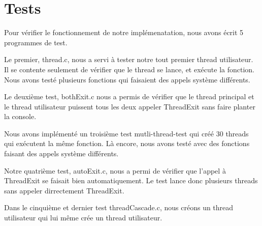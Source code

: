 \documentclass[12pt]{article}
\begin{document}
\section {Tests}

Pour vérifier le fonctionnement de notre implémenatation, nous avons écrit 5 programmes de test.

Le premier, thread.c, nous a servi à tester notre tout premier thread utilisateur. Il se contente seulement de vérifier que le thread se lance, et exécute la fonction. Nous avons testé plusieurs fonctions qui faisaient des appels système différents.

Le deuxième test, bothExit.c nous a permis de vérifier que le thread principal et le thread utilisateur puissent tous les deux appeler ThreadExit sans faire planter la console.

Nous avons implémenté un troisième test mutli-thread-test qui créé 30 threads qui exécutent la même fonction. Là encore, nous avons testé avec des fonctions faisant des appels système différents.

Notre quatrième test, autoExit.c, nous a permi de vérifier que l'appel à ThreadExit se faisait bien automatiquement. Le test lance donc plusieurs threads sans appeler dirrectement ThreadExit.

Dans le cinquième et dernier test threadCascade.c, nous créons un thread utilisateur qui lui même crée un thread utilisateur.
\end{document}
